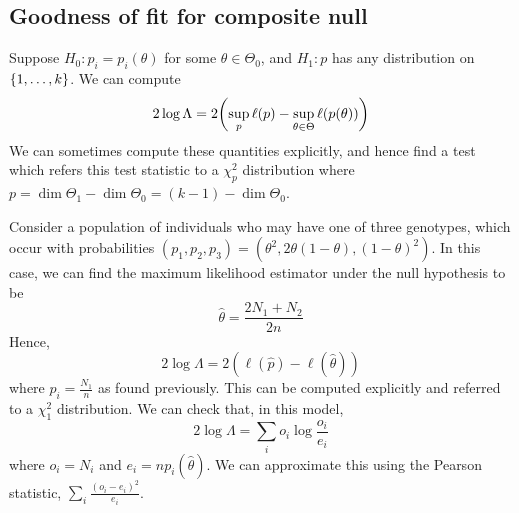\subsection{Goodness of fit for composite null}
Suppose \( H_0 \colon p_i = p_i(\theta) \) for some \( \theta \in \Theta_0 \), and \( H_1 \colon p \) has any distribution on \( \qty{1, \dots, k} \).
We can compute
\[ 2 \log \Lambda = 2 \qty( \sup_p \ell(p) - \sup_{\theta \in \Theta} \ell(p(\theta)) ) \]
We can sometimes compute these quantities explicitly, and hence find a test which refers this test statistic to a \( \chi^2_p \) distribution where \( p = \dim \Theta_1 - \dim \Theta_0 = (k-1) - \dim \Theta_0 \).
\begin{example}
	Consider a population of individuals who may have one of three genotypes, which occur with probabilities \( (p_1, p_2, p_3) = (\theta^2, 2\theta(1-\theta), (1-\theta)^2) \).
	In this case, we can find the maximum likelihood estimator under the null hypothesis to be
	\[ \hat \theta = \frac{2N_1 + N_2}{2n} \]
	Hence,
	\[ 2 \log \Lambda = 2(\ell(\hat p) - \ell(\hat \theta)) \]
	where \( \hat p_i = \frac{N_1}{n} \) as found previously.
	This can be computed explicitly and referred to a \( \chi^2_1 \) distribution.
	We can check that, in this model,
	\[ 2 \log \Lambda = \sum_i o_i \log \frac{o_i}{e_i} \]
	where \( o_i = N_i \) and \( e_i = n p_i(\hat \theta) \).
	We can approximate this using the Pearson statistic, \( \sum_i \frac{(o_i - e_i)^2}{e_i} \).
\end{example}

